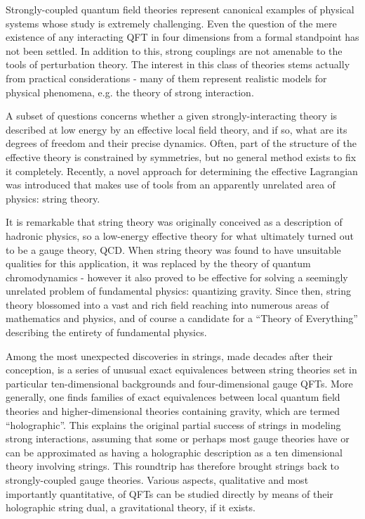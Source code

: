 Strongly-coupled quantum field theories represent canonical examples of physical systems whose study is extremely challenging. Even the question of the mere existence of any interacting QFT in four dimensions from a formal standpoint has not been settled. In addition to this, strong couplings are not amenable to the tools of perturbation theory. The interest in this class of theories stems actually from practical considerations - many of them represent realistic models for physical phenomena, e.g. the theory of strong interaction.

A subset of questions concerns whether a given strongly-interacting theory is described at low energy by an effective local field theory, and if so, what are its degrees of freedom and their precise dynamics. Often, part of the structure of the effective theory is constrained by symmetries, but no general method exists to fix it completely. Recently\cite{MZ}, a novel approach for determining the effective Lagrangian was introduced that makes use of tools from an apparently unrelated area of physics: string theory.

It is remarkable that string theory was originally conceived as a description of hadronic physics, so a low-energy effective theory for what ultimately turned out to be a gauge theory, QCD. When string theory was found to have unsuitable qualities for this application, it was replaced by the theory of quantum chromodynamics - however it also proved to be effective for solving a seemingly unrelated problem of fundamental physics: quantizing gravity. Since then, string theory blossomed into a vast and rich field reaching into numerous areas of mathematics and physics, and of course a candidate for a ``Theory of Everything'' describing the entirety of fundamental physics.

Among the most unexpected discoveries in strings, made decades after their conception, is a series of unusual exact equivalences between string theories set in particular ten-dimensional backgrounds and four-dimensional gauge QFTs. More generally, one finds families of exact equivalences between local quantum field theories and higher-dimensional theories containing gravity, which are termed ``holographic''. This explains the original partial success of strings in modeling strong interactions, assuming that some or perhaps most gauge theories have or can be approximated as having a holographic description as a ten dimensional theory involving strings. This roundtrip has therefore brought strings back to strongly-coupled gauge theories. Various aspects, qualitative and most importantly quantitative, of QFTs can be studied directly by means of their holographic string dual, a gravitational theory, if it exists. 

